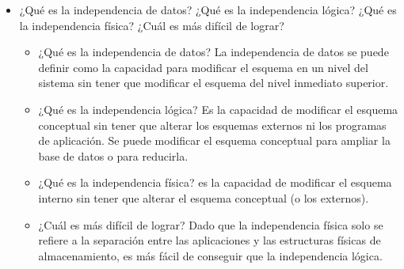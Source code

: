 \documentclass{article}
\begin{document}
\begin{enumerate}
\begin{itemize}
\begin{itemize}
            \item Usualmente, proveen interfaces y lenguajes de consulta que simplifican la recuperación de los datos.
        \end{itemize}
        
        Desventajas:
        \begin{itemize}
            \item Si se tienen muy pocos datos que son usados por un único usuario por vez y no hay que realizar consultas complejas sobre los datos, entonces es posible que sea mejor usar una planilla de cálculo.
            
            \item Coste de la BD, los requisitos de hardware para correr una base de datos por lo general son relativamente altos, por lo que estos equipos pueden llegar a costar gran cantidad de dinero.
            
            \item En caso de un accidente que corrompa la Base de datos, el proceso de recuperación  y de devolver a  la Base de Datos su estado anterior al problema, es mucho mas complejo de ejecutar que en sistemas tradicionales. 
            
        \end{itemize}
        
        \item ¿Qué es la independencia de datos? ¿Qué es la independencia lógica? ¿Qué es la independencia física? ¿Cuál es más difícil de lograr?
        \begin{itemize}
            \item ¿Qué es la independencia de datos? La independencia de datos se puede definir como la capacidad para modificar el esquema en un nivel del sistema sin tener que modificar el esquema del nivel inmediato superior.
            
            \item ¿Qué es la independencia lógica? Es la capacidad de modificar el esquema conceptual sin tener que alterar los esquemas externos ni los programas de aplicación. Se puede modificar el esquema conceptual para ampliar la base de datos o para reducirla.
            
            \item ¿Qué es la independencia física? es la capacidad de modificar el esquema interno sin tener que alterar el esquema conceptual (o los externos).
            
            \item ¿Cuál es más difícil de lograr? Dado que la independencia física solo se refiere  a la separación entre las aplicaciones y las estructuras físicas de almacenamiento, es más fácil de conseguir que la independencia lógica.
            

\end{itemize}
\end{itemize}
\end{enumerate}
\end{document}
